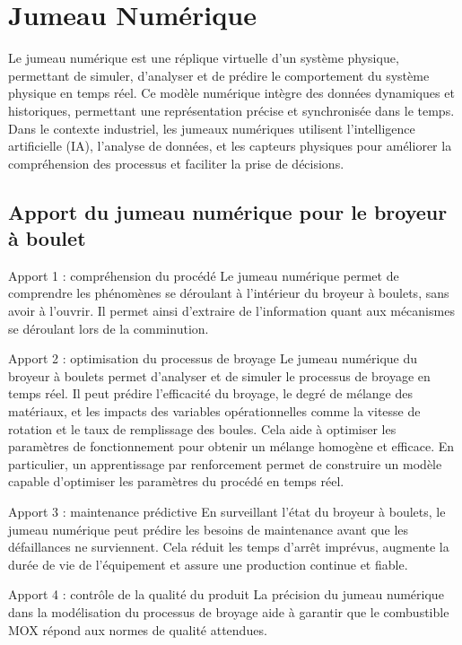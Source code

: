 

\section{Jumeau Numérique}

Le jumeau numérique est une réplique virtuelle d'un système physique, permettant de simuler, d'analyser et de prédire le comportement du système physique en temps réel. Ce modèle numérique intègre des données dynamiques et historiques, permettant une représentation précise et synchronisée dans le temps. Dans le contexte industriel, les jumeaux numériques utilisent l'intelligence artificielle (IA), l'analyse de données, et les capteurs physiques pour améliorer la compréhension des processus et faciliter la prise de décisions.

\subsection{Apport du jumeau numérique pour le broyeur à boulet}
Apport 1 : compréhension du procédé
Le jumeau numérique permet de comprendre les phénomènes se déroulant à l'intérieur du broyeur à boulets, sans avoir à l'ouvrir. Il permet ainsi d'extraire de l'information quant aux mécanismes se déroulant lors de la comminution.

Apport 2 : optimisation du processus de broyage
Le jumeau numérique du broyeur à boulets permet d'analyser et de simuler le processus de broyage en temps réel. Il peut prédire l'efficacité du broyage, le degré de mélange des matériaux, et les impacts des variables opérationnelles comme la vitesse de rotation et le taux de remplissage des boules. Cela aide à optimiser les paramètres de fonctionnement pour obtenir un mélange homogène et efficace. En particulier, un apprentissage par renforcement permet de construire un modèle capable d'optimiser les paramètres du procédé en temps réel.

Apport 3 : maintenance prédictive
En surveillant l'état du broyeur à boulets, le jumeau numérique peut prédire les besoins de maintenance avant que les défaillances ne surviennent. Cela réduit les temps d'arrêt imprévus, augmente la durée de vie de l'équipement et assure une production continue et fiable.

Apport 4 : contrôle de la qualité du produit
La précision du jumeau numérique dans la modélisation du processus de broyage aide à garantir que le combustible MOX répond aux normes de qualité attendues.

